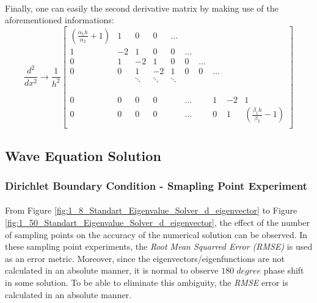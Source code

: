 \documentclass[letterpaper,12pt]{article}
\begin{document}
\paragraph{} Finally, one can easily the second derivative matrix by making use of the aforementioned informations:
\begin{equation*}
    \frac{d^2}{dx^2} \rightarrow \frac{1}{h^2}\begin{bmatrix}
        \left(\frac{\alpha_1h}{\alpha_2} + 1\right) & 1 & 0 & 0 & \hdots\\
        1  & -2 & 1 & 0 & 0 &\hdots\\
        0  & 1 & -2 & 1 & 0 & 0 &\hdots \\
        0  & 0 & 1 & -2 & 1 & 0 & 0 &\hdots\\
           &   & \ddots  & \ddots   & \ddots  \\ 
           \\
           \\
           \\
        0 & 0 & 0 & 0 &  & \hdots  &   &  1 & -2 & 1 \\ 
        0 & 0 & 0 & 0 &  & \hdots  &   &  0 & 1 & \left(\frac{\beta_1h}{\beta_2} - 1\right) \\   
    \end{bmatrix}
\end{equation*}

\subsection{Wave Equation Solution}
\subsubsection{Dirichlet Boundary Condition - Smapling Point Experiment}


\paragraph{} From Figure \ref{fig:1_8_Standart_Eigenvalue_Solver_d_eigenvector} to Figure \ref{fig:1_50_Standart_Eigenvalue_Solver_d_eigenvector}, the effect of the number of sampling points on the accuracy of the numerical solution can be observed. In these sampling point experiments, the \textit{Root Mean Squarred Error (RMSE)} is used as an error metric. Moreover, since the eigenvectors/eigenfunctions are not calculated in an absolute manner, it is normal to observe $180 \; degree$ phase shift in some solution. To be able to eliminate this ambiguity, the \textit{RMSE} error is calculated in an absolute manner. 
\end{document}
